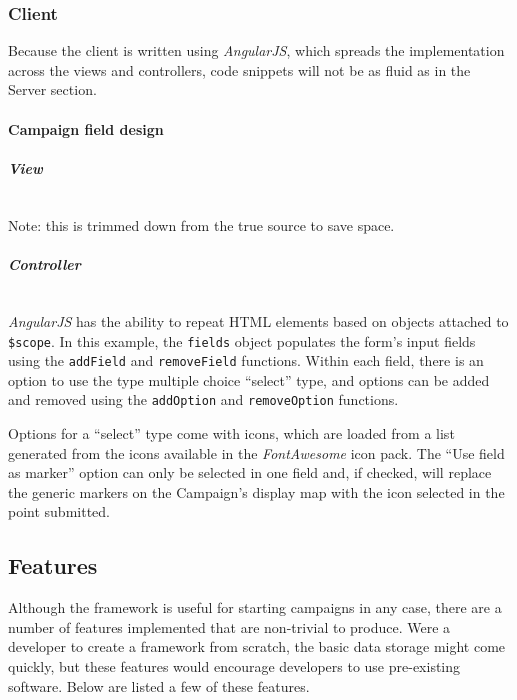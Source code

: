 \documentclass{article}
\begin{document}
	\subsubsection{Client}

	Because the client is written using \emph{AngularJS}, which spreads the implementation across the views and controllers, code snippets will not be as fluid as in the Server section.

	\paragraph{Campaign field design}

	\subparagraph{View}
	\inputminted[frame=single,linenos,breaklines,fontsize=\scriptsize]{xml}{snippets/campaign-field-design.html}
	Note: this is trimmed down from the true source to save space.

	\subparagraph{Controller}
	\inputminted[frame=single,linenos,breaklines,fontsize=\scriptsize]{js}{snippets/campaign-field-design.js}

	\emph{AngularJS} has the ability to repeat HTML elements based on objects attached to \texttt{\$scope}. In this example, the \texttt{fields} object populates the form's input fields using the \texttt{addField} and \texttt{removeField} functions. Within each field, there is an option to use the type multiple choice ``select'' type, and options can be added and removed using the \texttt{addOption} and \texttt{removeOption} functions.

	Options for a ``select'' type come with icons, which are loaded from a list generated from the icons available in the \emph{FontAwesome} icon pack. The ``Use field as marker'' option can only be selected in one field and, if checked, will replace the generic markers on the Campaign's display map with the icon selected in the point submitted.

	\subsection{Features}

	Although the framework is useful for starting campaigns in any case, there are a number of features implemented that are non-trivial to produce. Were a developer to create a framework from scratch, the basic data storage might come quickly, but these features would encourage developers to use pre-existing software. Below are listed a few of these features.
\end{document}
